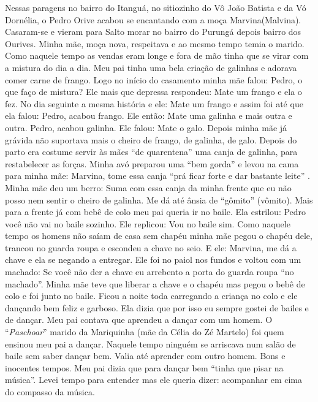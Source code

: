 \documentclass[12pt,brazil,]{book}
\begin{document}
Nessas paragens no bairro do Itanguá, no sitiozinho do Vô João Batista e
da Vó Dornélia, o Pedro Orive acabou se encantando com a moça
Marvina(Malvina). Casaram-se e vieram para Salto morar no bairro do
Purungá depois bairro dos Ourives. Minha mãe, moça nova, respeitava e ao
mesmo tempo temia o marido. Como naquele tempo as vendas eram longe e
fora de mão tinha que se virar com a mistura do dia a dia. Meu pai tinha
uma bela criação de galinhas e adorava comer carne de frango. Logo no
início do casamento minha mãe falou: Pedro, o que faço de mistura? Ele
mais que depressa respondeu: Mate um frango e ela o fez. No dia seguinte
a mesma história e ele: Mate um frango e assim foi até que ela falou:
Pedro, acabou frango. Ele então: Mate uma galinha e mais outra e outra.
Pedro, acabou galinha. Ele falou: Mate o galo. Depois minha mãe já
grávida não suportava mais o cheiro de frango, de galinha, de galo.
Depois do parto era costume servir às mães ``de quarentena'' uma canja
de galinha, para restabelecer as forças. Minha avó preparou uma ``bem
gorda'' e levou na cama para minha mãe: Marvina, tome essa canja ``prá
ficar forte e dar bastante leite'' . Minha mãe deu um berro: Suma com
essa canja da minha frente que eu não posso nem sentir o cheiro de
galinha. Me dá até ânsia de ``gômito'' (vômito). Mais para a frente já
com bebê de colo meu pai queria ir no baile. Ela estrilou: Pedro você
não vai no baile sozinho. Ele replicou: Vou no baile sim. Como naquele
tempo os homens não saíam de casa sem chapéu minha mãe pegou o chapéu
dele, trancou no guarda roupa e escondeu a chave no seio. E ele:
Marvina, me dá a chave e ela se negando a entregar. Ele foi no paiol nos
fundos e voltou com um machado: Se você não der a chave eu arrebento a
porta do guarda roupa ``no machado''. Minha mãe teve que liberar a chave
e o chapéu mas pegou o bebê de colo e foi junto no baile. Ficou a noite
toda carregando a criança no colo e ele dançando bem feliz e garboso.
Ela dizia que por isso eu sempre gostei de bailes e de dançar. Meu pai
contava que aprendeu a dançar com um homem. O ``\emph{Paschoar}'' marido
da Mariquinha (mãe da Célia do Zé Martelo) foi quem ensinou meu pai a
dançar. Naquele tempo ninguém se arriscava num salão de baile sem saber
dançar bem. Valia até aprender com outro homem. Bons e inocentes tempos.
Meu pai dizia que para dançar bem ``tinha que pisar na música''. Levei
tempo para entender mas ele queria dizer: acompanhar em cima do compasso
da música.
\end{document}
